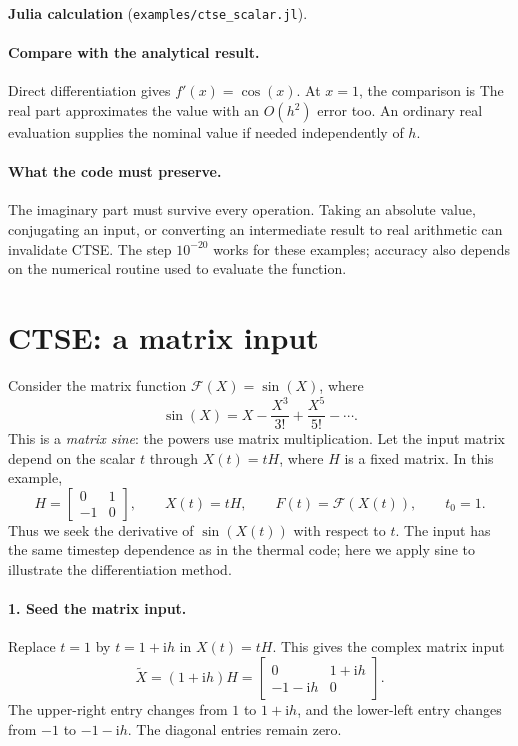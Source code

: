 \documentclass[11pt]{article}
\newcommand{\ii}{\mathrm i}
\newcommand{\juliascript}[1]{\par\medskip\needspace{6\baselineskip}\noindent
  \textbf{Julia calculation} (\nolinkurl{examples/#1}).\par
  }
\begin{document}
\juliascript{ctse_scalar.jl}
\paragraph{Compare with the analytical result.}
Direct differentiation gives $f'(x)=\cos(x)$. At $x=1$, the comparison is
%
The real part approximates the value with an $O(h^2)$ error too. An ordinary
real evaluation supplies the nominal value if needed independently of $h$.

\paragraph{What the code must preserve.}
The imaginary part must survive every operation. Taking an absolute value,
conjugating an input, or converting an intermediate result to real arithmetic
can invalidate CTSE. The step $10^{-20}$ works for these examples; accuracy
also depends on the numerical routine used to evaluate the function.

\section{CTSE: a matrix input}\label{sec:ctse-matrix}
Consider the matrix function $\mathcal F(X)=\sin(X)$, where
\[
 \sin(X)=X-\frac{X^3}{3!}+\frac{X^5}{5!}-\cdots.
\]
This is a \emph{matrix sine}: the powers use matrix multiplication.
Let the input matrix depend on the scalar $t$ through $X(t)=tH$, where $H$
is a fixed matrix. In this example,
\[
 H=\begin{bmatrix}0&1\\-1&0\end{bmatrix},\qquad
 X(t)=tH,\qquad F(t)=\mathcal F(X(t)),\qquad t_0=1.
\]
Thus we seek the derivative of $\sin(X(t))$ with respect to $t$.
The input has the same timestep dependence as in the thermal code; here we
apply sine to illustrate the differentiation method.

\paragraph{1. Seed the matrix input.}
Replace $t=1$ by $t=1+\ii h$ in $X(t)=tH$. This gives the complex matrix input
\[
 \widetilde X=(1+\ii h)H
 =\begin{bmatrix}0&1+\ii h\\-1-\ii h&0\end{bmatrix}.
\]
The upper-right entry changes from $1$ to $1+\ii h$, and the lower-left entry
changes from $-1$ to $-1-\ii h$. The diagonal entries remain zero.
\end{document}
